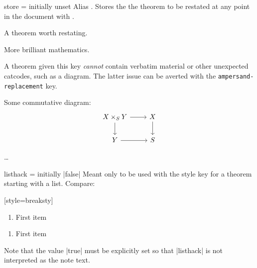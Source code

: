 \documentclass{ltxdoc}
\begin{document}
\begin{docKey}{store}
  {=}
  {initially unset}
Alias . Stores the the theorem to be restated at any point in the document with .

\begin{keythmscode}[]
\begin{theorem}[store=blub]
A theorem worth restating.
\end{theorem}
More brilliant mathematics.
\end{keythmscode}

A theorem given this key \emph{cannot} contain verbatim material or other unexpected catcodes, such as a  diagram. The latter issue can be averted with the \texttt{ampersand-replacement} key.

\begin{tcbwritetemp}
\usepackage{tikz}
\usetikzlibrary{cd}
\end{tcbwritetemp}

\begin{keythmscode}[withpreamble]
\begin{lemma}[store=diagram]
Some commutative diagram:
\[\begin{tikzcd}[ampersand replacement=\&]
X\times_S Y \ar[r] \ar[d] \& X \ar[d] \\
Y \ar[r] \& S
\end{tikzcd}\]
\end{lemma}
\dots
{}
\end{keythmscode}

\end{docKey}

\begin{docKey}{listhack}
  {=\textbar{}}
  {initially |false|}
Meant only to be used with the  style key for a theorem starting with a list. Compare:

\begin{tcbwritetemp}
[style=breaksty]
\end{tcbwritetemp}

\begin{keythmscode}[withpreamble]
\begin{observation}
\begin{enumerate}
\item First item
\end{enumerate}
\end{observation}

\begin{observation}[listhack=true]
\begin{enumerate}
\item First item
\end{enumerate}
\end{observation}
\end{keythmscode}

Note that the value |true| must be explicitly set so that |listhack| is not interpreted as the note text.
\end{docKey}
\end{document}
